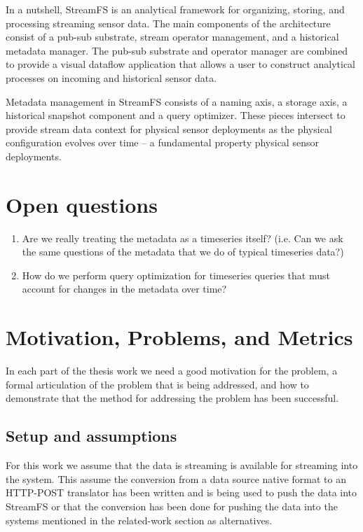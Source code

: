 In a nutshell, StreamFS is an analytical framework for organizing, storing, and processing streaming sensor data.
The main components of the architecture consist of a pub-sub substrate, stream operator management, and a historical
metadata manager.  The pub-sub substrate and operator manager are combined to provide a visual dataflow application
that allows a user to construct analytical processes on incoming and historical sensor data.  

Metadata management in StreamFS consists of a naming axis, a storage axis, a historical snapshot component and a query optimizer.
These pieces intersect to provide stream data context for physical sensor deployments as the physical configuration evolves over time --
a fundamental property physical sensor deployments.

\section{Open questions}
\begin{enumerate}
\item Are we really treating the metadata as a timeseries itself?  (i.e. Can we ask the same questions of the metadata that we do of typical timeseries
data?)
\item How do we perform query optimization for timeseries queries that must account for changes in the metadata over time?
\end{enumerate}

\section{Motivation, Problems, and Metrics}
In each part of the thesis work we need a good motivation for the problem, a formal articulation of the problem that 
is being addressed, and how to demonstrate that the method for addressing the problem has been successful.

\subsection{Setup and assumptions}
For this work we assume that the data is streaming is available for streaming into the system.  This assume the conversion from
a data source native format to an HTTP-POST translator has been written and is being used to push the data into StreamFS or
that the conversion has been done for pushing the data into the systems mentioned in the related-work section as alternatives.


